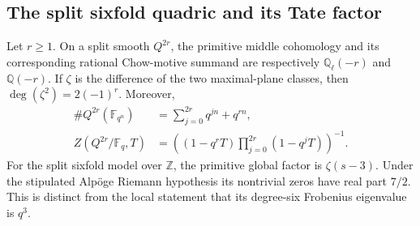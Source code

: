 \subsection{The split sixfold quadric and its Tate factor}

\begin{proposition}
Let $r\ge1$. On a split smooth $Q^{2r}$, the primitive middle cohomology and its corresponding rational Chow-motive summand are respectively $\mathbb Q_\ell(-r)$ and $\mathbb Q(-r)$. If $\zeta$ is the difference of the two maximal-plane classes, then $\deg(\zeta^2)=2(-1)^r$. Moreover,
\begin{align*}
 \#Q^{2r}(\mathbb F_{q^n})&=\sum_{j=0}^{2r}q^{jn}+q^{rn},\\
 Z(Q^{2r}/\mathbb F_q,T)&=
 \left((1-q^rT)\prod_{j=0}^{2r}(1-q^jT)\right)^{-1}.
\end{align*}
For the split sixfold model over $\mathbb Z$, the primitive global factor is $\zeta(s-3)$. Under the stipulated Alp\"oge Riemann hypothesis its nontrivial zeros have real part $7/2$. This is distinct from the local statement that its degree-six Frobenius eigenvalue is $q^3$.
\end{proposition}

